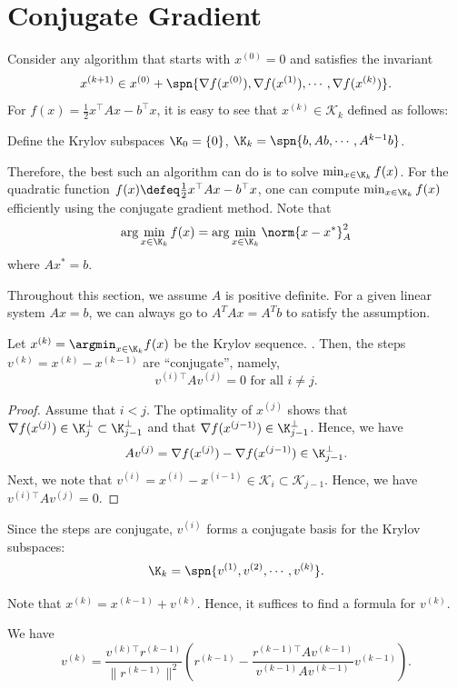 %

\section{Conjugate Gradient}

Consider any algorithm that starts with $x^{(0)}=0$ and satisfies
the invariant
\[
x^{(k+1)}\in x^{(0)}+\spn\{\nabla f(x^{(0)}),\nabla f(x^{(1)}),\cdots,\nabla f(x^{(k)})\}.
\]
For $f(x)=\frac{1}{2}x^{\top}Ax-b^{\top}x$, it is easy to see that
$x^{(k)}\in\mathcal{K}_{k}$ defined as follows:
\begin{defn}
Define the Krylov subspaces $\K_{0}=\{0\}$, $\K_{k}=\spn\{b,Ab,\cdots,A^{k-1}b\}$.

Therefore, the best such an algorithm can do is to solve $\min_{x\in\K_{k}}f(x)$.
For the quadratic function $f(x)\defeq\frac{1}{2}x^{\top}Ax-b^{\top}x$,
one can compute $\min_{x\in\K_{k}}f(x)$ efficiently using the conjugate
gradient method. Note that 
\[
\arg\min_{x\in\K_{k}}f(x)=\arg\min_{x\in\K_{k}}\norm{x-x^{*}}_{A}^{2}
\]
where $Ax^{*}=b$.

Throughout this section, we assume $A$ is positive definite. For
a given linear system $Ax=b$, we can always go to $A^{T}Ax=A^{T}b$
to satisfy the assumption.
\end{defn}

\begin{lem}
Let $x^{(k)}=\argmin_{x\in\K_{k}}f(x)$ be the Krylov sequence. .
Then, the steps $v^{(k)}=x^{(k)}-x^{(k-1)}$ are ``conjugate'',
namely,
\[
v^{(i)\top}Av^{(j)}=0\text{ for all }i\neq j.
\]
\end{lem}

\begin{proof}
Assume that $i<j$. The optimality of $x^{(j)}$ shows that $\nabla f(x^{(j)})\in\K_{j}^{\perp}\subset\K_{j-1}^{\perp}$
and that $\nabla f(x^{(j-1)})\in\K_{j-1}^{\perp}$. Hence, we have
\[
Av^{(j)}=\nabla f(x^{(j)})-\nabla f(x^{(j-1)})\in\K_{j-1}^{\perp}.
\]
Next, we note that $v^{(i)}=x^{(i)}-x^{(i-1)}\in\mathcal{K}_{i}\subset\mathcal{K}_{j-1}$.
Hence, we have $v^{(i)\top}Av^{(j)}=0$.
\end{proof}
Since the steps are conjugate, $v^{(i)}$ forms a conjugate basis
for the Krylov subspaces:
\[
\K_{k}=\spn\{v^{(1)},v^{(2)},\cdots,v^{(k)}\}.
\]

Note that $x^{(k)}=x^{(k-1)}+v^{(k)}$. Hence, it suffices to find
a formula for $v^{(k)}$.
\begin{lem}
\label{lem:CG_v}We have 
\[
v^{(k)}=\frac{v^{(k)\top}r^{(k-1)}}{\|r^{(k-1)}\|^{2}}\left(r^{(k-1)}-\frac{r^{(k-1)\top}Av^{(k-1)}}{v^{(k-1)}Av^{(k-1)}}v^{(k-1)}\right).
\]
\end{lem}

